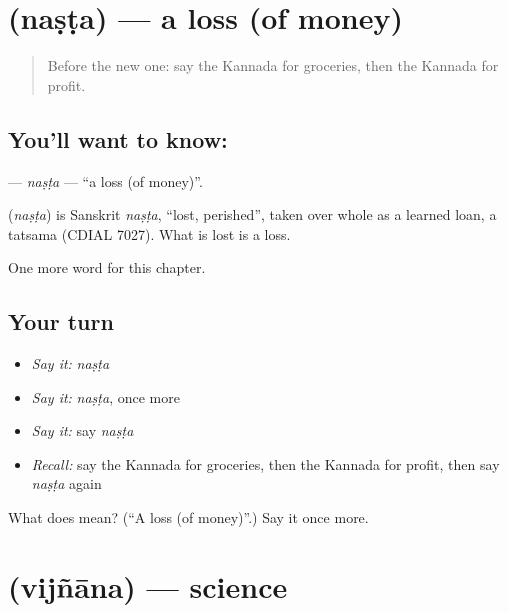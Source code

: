 \section[\texorpdfstring{\kn{ನಷ್ಟ} (naṣṭa)}{ನಷ್ಟ (naṣṭa)}]{ (naṣṭa) — a loss (of money)}

\label{lesson:KA-C233-nasta}



\begin{quote}
Before the new one: say the Kannada for groceries, then the Kannada for profit.
\end{quote}

\subsection*{You'll want to know: }
\textbf{} — \emph{naṣṭa} — \textquotedblleft{}a loss (of money)\textquotedblright{}.

\begin{cousinweb}
\textbf{} (\emph{naṣṭa}) is Sanskrit \emph{naṣṭa}, \textquotedblleft{}lost, perished\textquotedblright{}, taken over whole as a learned loan, a tatsama (CDIAL 7027). What is lost is a loss.
\end{cousinweb}

\begin{grammarlens}[title={What you've built}]
One more word for this chapter.
\end{grammarlens}

\subsection*{Your turn}
\begin{itemize}
\raggedright
  \item \emph{Say it:} \emph{naṣṭa}
  \item \emph{Say it:} \emph{naṣṭa}, once more
  \item \emph{Say it:} say \emph{naṣṭa}
  \item \emph{Recall:} say the Kannada for groceries, then the Kannada for profit, then say \emph{naṣṭa} again
\end{itemize}

\begin{tcolorbox}[breakable,colback=teal!4,colframe=teal!35!black,title={Before you move on}]
What does  mean? (\textquotedblleft{}A loss (of money)\textquotedblright{}.) Say it once more.
\end{tcolorbox}
\section[\texorpdfstring{\kn{ವಿಜ್ಞಾನ} (vijñāna)}{ವಿಜ್ಞಾನ (vijñāna)}]{ (vijñāna) — science}

